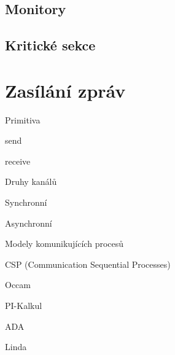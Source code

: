 \begin{compactitem}
    \item {}
\end{compactitem}

\subsection{Monitory}

\begin{compactitem}
    \item {}
\end{compactitem}

\subsection{Kritické sekce}

\begin{compactitem}
    \item {}
\end{compactitem}


\section{Zasílání zpráv}

\begin{compactitem}
    \item Primitiva \begin{compactitem}
        \item send
        \item receive
    \end{compactitem}

    \item Druhy kanálů \begin{compactitem}
        \item Synchronní
        \item Asynchronní
    \end{compactitem}

    \item Modely komunikujících procesů \begin{compactitem}
        \item CSP (Communication Sequential Processes)
        \item Occam
        \item PI-Kalkul
        \item ADA
        \item Linda
    \end{compactitem}
\end{compactitem}
